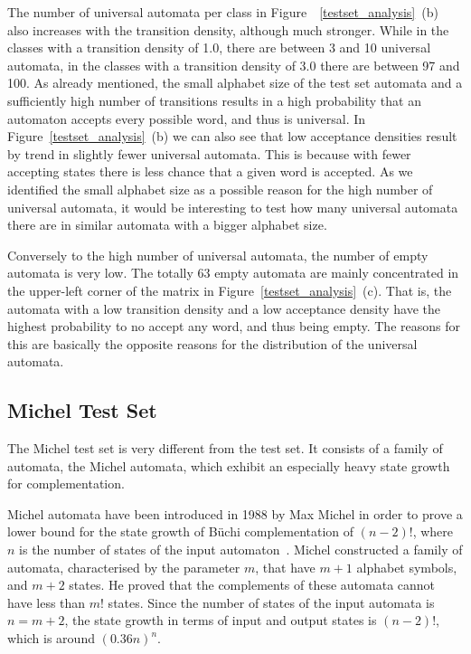 The number of universal automata per class in Figure~~\ref{testset_analysis}~(b) also increases with the transition density, although much stronger. While in the classes with a transition density of 1.0, there are between 3 and 10 universal automata, in the classes with a transition density of 3.0 there are between 97 and 100. As already mentioned, the small alphabet size of the \goal{} test set automata and a sufficiently high number of transitions results in a high probability that an automaton accepts every possible word, and thus is universal. In Figure~\ref{testset_analysis}~(b) we can also see that low acceptance densities result by trend in slightly fewer universal automata. This is because with fewer accepting states there is less chance that a given word is accepted. As we identified the small alphabet size as a possible reason for the high number of universal automata, it would be interesting to test how many universal automata there are in similar automata with a bigger alphabet size.

Conversely to the high number of universal automata, the number of empty automata is very low. The totally 63 empty automata are mainly concentrated in the upper-left corner of the matrix in Figure~\ref{testset_analysis}~(c). That is, the automata with a low transition density and a low acceptance density have the highest probability to no accept any word, and thus being empty. The reasons for this are basically the opposite reasons for the distribution of the universal automata.


\subsection{Michel Test Set}
\label{4_michel_testset}
The Michel test set is very different from the \goal{} test set. It consists of a family of automata, the Michel automata, which exhibit an especially heavy state growth for complementation.

Michel automata have been introduced in 1988 by Max Michel in order to prove a lower bound for the state growth of Büchi complementation of $(n-2)!$, where $n$ is the number of states of the input automaton~\cite{michel1988}\cite{1996_thomas}. Michel constructed a family of automata, characterised by the parameter $m$, that have $m+1$ alphabet symbols, and $m+2$ states. He proved that the complements of these automata cannot have less than $m!$ states. Since the number of states of the input automata is $n = m + 2$, the state growth in terms of input and output states is $(n-2)!$, which is around $(0.36n)^n$.

